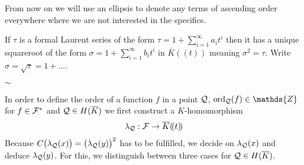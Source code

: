 \documentclass[english,11pt,a4paper]{article}
\begin{document}
From now on we will use an ellipsis to denote any terms of ascending order everywhere where we are not interested in the specifics.

If $\tau$ is a formal Laurent series of the form $\tau = 1 + \sum_{i = 1}^{\infty} a_i t^i$ then it has a unique squareroot of the form $\sigma = 1+\sum_{i = 1}^{\infty} b_i t^i$ in $\bar K (\! (t)\! )$ meaning $\sigma^2 = \tau$. Write $\sigma = \sqrt \tau = 1 + \dots$.

\vspace{-3mm}
\begin{center}
$\sim$
\end{center}

In order to define the order of a function $f$ in a point $\mathcal{Q}$, $\ordq (f) \in \mathds{Z}$ for $f \in \mathcal{F}^*$ and $\mathcal{Q} \in H(\overline K)$ we first construct a $K$-homomorphism
\begin{align*}
  \lambda_{\mathcal{Q}}: \mathcal{F} \rightarrow \overline K (\! (t)\! )
\end{align*}
Because $C\big(\lambda_{\mathcal{Q}}(x)\big)=\big(\lambda_{\mathcal{Q}}(y)\big)^2$ has to be fulfilled, we decide on $\lambda_{\mathcal{Q}}(x)$ and deduce $\lambda_{\mathcal{Q}}(y)$. For this, we distinguish between three cases for $\mathcal{Q} \in H(\overline K)$.
\end{document}
